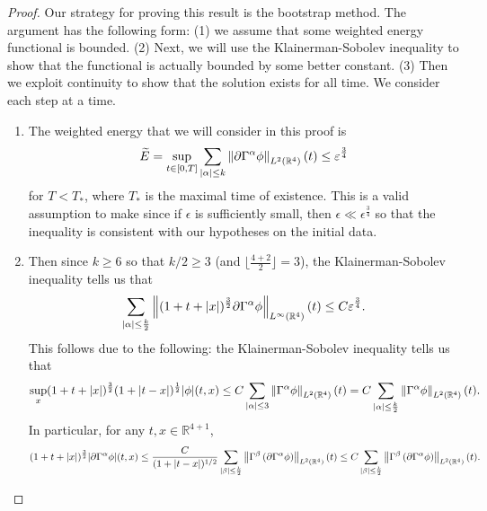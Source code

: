 \documentclass{article}
\begin{document}
\begin{proof}
	Our strategy for proving this result is the bootstrap method. The argument has the following form: (1) we assume that some weighted energy functional is bounded. (2) Next, we will use the Klainerman-Sobolev inequality to show that the functional is actually bounded by some better constant. (3) Then we exploit continuity to show that the solution exists for all time. We consider each step at a time. \vspace{-0.25cm}
	\begin{enumerate}[itemsep =-2pt,label = (\alph{*})]
		\item The weighted energy that we will consider in this proof is 
			\begin{equation*}
				\widetilde{E} = \sup_{t \in [0,T]}\sum_{|\alpha|\leq k}\left\Vert \partial \Gamma^{\alpha}\phi \right\Vert_{L^{2}(\mathbb{R}^{4})}(t) \leq \varepsilon^{\frac{3}{4}}
			\end{equation*} 
			for $T < T_{\ast}$, where $T_{\ast}$ is the maximal time of existence. This is a valid assumption to make since if $\epsilon$ is sufficiently small, then $\epsilon \ll \epsilon^{\frac{3}{4}}$ so that the inequality is consistent with our hypotheses on the initial data. 
			\item Then since $k \geq 6$ so that $k/2 \geq 3$ (and $\lfloor \frac{4 + 2}{2} \rfloor = 3$), the Klainerman-Sobolev inequality tells us that 
			\begin{equation*}
				\sum_{|\alpha| \leq \frac{k}{2}}\left\Vert (1 + t + |x|)^{\frac{3}{2}}\partial\Gamma^{\alpha}\phi \right\Vert_{L^{\infty}(\mathbb{R}^{4})}(t) \leq C\varepsilon^{\frac{3}{4}}. 
			\end{equation*} 
			This follows due to the following: the Klainerman-Sobolev inequality tells us that 
			\begin{equation*}
				\sup_{x}(1 + t + |x|)^{\frac{3}{2}}(1 + |t - x|)^{\frac{1}{2}}|\phi|(t, x) \leq C \sum_{|\alpha|\leq 3}\left\Vert \Gamma^{\alpha}\phi \right\Vert_{L^{2}(\mathbb{R}^{4})}(t) = C\sum_{|\alpha| \leq \frac{k}{2}}\left\Vert \Gamma^{\alpha}\phi \right\Vert_{L^{2}(\mathbb{R}^{4})}(t). 
			\end{equation*} 
			In particular, for any $t, x \in \mathbb{R}^{4 + 1}$, 
			\begin{equation*}
				(1 + t + |x|)^{\frac{3}{2}}|\partial\Gamma^{\alpha}\phi|(t,x) \leq \frac{C}{(1 + |t - x|)^{1/2}}\sum_{|\beta|\leq \frac{k}{2}}\norm{\Gamma^{\beta}\left(\partial \Gamma^{\alpha}\phi\right)}_{L^{2}(\mathbb{R}^{4})}(t) \leq C\sum_{|\beta|\leq \frac{k}{2}}\norm{\Gamma^{\beta}\left(\partial\Gamma^{\alpha}\phi\right)}_{L^{2}(\mathbb{R}^{4})}(t). 

\end{equation*}
\end{enumerate}
\end{proof}
\end{document}
